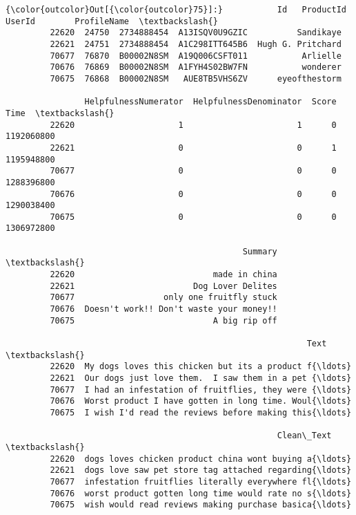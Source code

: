 \documentclass[11pt]{article}
\begin{document}
\begin{Verbatim}[commandchars=\\\{\}]
{\color{outcolor}Out[{\color{outcolor}75}]:}           Id   ProductId          UserId        ProfileName  \textbackslash{}
         22620  24750  2734888454  A13ISQV0U9GZIC          Sandikaye   
         22621  24751  2734888454  A1C298ITT645B6  Hugh G. Pritchard   
         70677  76870  B00002N8SM  A19Q006CSFT011           Arlielle   
         70676  76869  B00002N8SM  A1FYH4S02BW7FN           wonderer   
         70675  76868  B00002N8SM   AUE8TB5VHS6ZV      eyeofthestorm   
         
                HelpfulnessNumerator  HelpfulnessDenominator  Score        Time  \textbackslash{}
         22620                     1                       1      0  1192060800   
         22621                     0                       0      1  1195948800   
         70677                     0                       0      0  1288396800   
         70676                     0                       0      0  1290038400   
         70675                     0                       0      0  1306972800   
         
                                                Summary  \textbackslash{}
         22620                            made in china   
         22621                        Dog Lover Delites   
         70677                  only one fruitfly stuck   
         70676  Doesn't work!! Don't waste your money!!   
         70675                            A big rip off   
         
                                                             Text  \textbackslash{}
         22620  My dogs loves this chicken but its a product f{\ldots}   
         22621  Our dogs just love them.  I saw them in a pet {\ldots}   
         70677  I had an infestation of fruitflies, they were {\ldots}   
         70676  Worst product I have gotten in long time. Woul{\ldots}   
         70675  I wish I'd read the reviews before making this{\ldots}   
         
                                                       Clean\_Text  \textbackslash{}
         22620  dogs loves chicken product china wont buying a{\ldots}   
         22621  dogs love saw pet store tag attached regarding{\ldots}   
         70677  infestation fruitflies literally everywhere fl{\ldots}   
         70676  worst product gotten long time would rate no s{\ldots}   
         70675  wish would read reviews making purchase basica{\ldots}   
         

\end{Verbatim}
\end{document}
